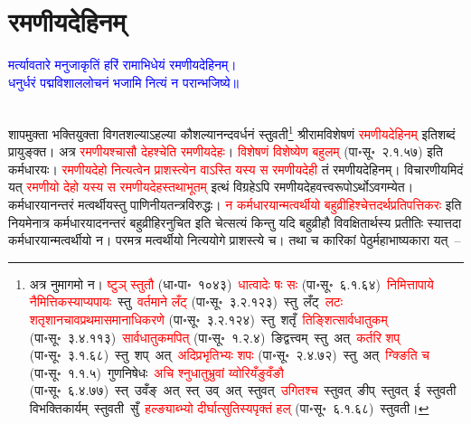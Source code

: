 \section[रमणीयदेहिनम्]{रमणीयदेहिनम्‌}
\centering\textcolor{blue}{मर्त्यावतारे मनुजाकृतिं हरिं रामाभिधेयं रमणीयदेहिनम्।\nopagebreak\\
धनुर्धरं पद्मविशाललोचनं भजामि नित्यं न परान्भजिष्ये॥}\nopagebreak\\
\\
\begin{sloppypar}\justifying\noindent\hspace{10mm} शाप\-मुक्ता भक्ति\-युक्ता विगत\-शल्याऽहल्या कौशल्यानन्द\-वर्धनं स्तुवती\footnote{अत्र नुमागमो न। \textcolor{red}{ष्टुञ् स्तुतौ} (धा॰पा॰~१०४३)~\arrow \textcolor{red}{धात्वादेः षः सः} (पा॰सू॰~६.१.६४)~\arrow \textcolor{red}{निमित्तापाये नैमित्तिकस्याप्यपायः}~\arrow स्तु~\arrow \textcolor{red}{वर्तमाने लँट्‌} (पा॰सू॰~३.२.१२३)~\arrow स्तु~लँट्~\arrow \textcolor{red}{लटः शतृ\-शानचावप्रथमा\-समानाधिकरणे} (पा॰सू॰~३.२.१२४)~\arrow स्तु~शतृँ~\arrow \textcolor{red}{तिङ्शित्सार्वधातुकम्‌} (पा॰सू॰~३.४.११३)~\arrow \textcolor{red}{सार्वधातुकमपित्‌} (पा॰सू॰~१.२.४)~\arrow ङिद्वत्त्वम्~\arrow स्तु~अत्~\arrow \textcolor{red}{कर्तरि शप्‌} (पा॰सू॰~३.१.६८)~\arrow स्तु~शप्~अत्~\arrow \textcolor{red}{अदिप्रभृतिभ्यः शपः} (पा॰सू॰~२.४.७२)~\arrow स्तु~अत्~\arrow \textcolor{red}{ग्क्ङिति च} (पा॰सू॰~१.१.५)~\arrow गुणनिषेधः~\arrow \textcolor{red}{अचि श्नुधातुभ्रुवां य्वोरियँङुवँङौ} (पा॰सू॰~६.४.७७)~\arrow स्त्~उवँङ्~अत्~\arrow स्त्~उव्~अत्~\arrow स्तुवत्~\arrow \textcolor{red}{उगितश्च}~\arrow स्तुवत्~ङीप्~\arrow स्तुवत्~ई~\arrow स्तुवती~\arrow विभक्तिकार्यम्~\arrow स्तुवती~सुँ~\arrow \textcolor{red}{हल्ङ्याब्भ्यो दीर्घात्सुतिस्यपृक्तं हल्‌} (पा॰सू॰~६.१.६८)~\arrow स्तुवती।} श्रीराम\-विशेषणं \textcolor{red}{रमणीय\-देहिनम्‌} इति\-शब्दं प्रायुङ्क्त। अत्र \textcolor{red}{रमणीयश्चासौ देहश्चेति रमणीय\-देहः}। \textcolor{red}{विशेषणं विशेष्येण बहुलम्‌} (पा॰सू॰~२.१.५७) इति कर्मधारयः। \textcolor{red}{रमणीय\-देहो नित्यत्वेन प्राशस्त्येन वाऽस्ति यस्य स रमणीय\-देही} तं रमणीय\-देहिनम्। विचारणीयमिदं यत् \textcolor{red}{रमणीयो देहो यस्य स रमणीयदेहस्तथाभूतम्‌} इत्थं विग्रहेऽपि रमणीय\-देहवत्त्व\-रूपोऽर्थोऽवगम्येत। कर्मधारयानन्तरं मत्वर्थीयस्तु पाणिनीय\-तन्त्र\-विरुद्धः। \textcolor{red}{न कर्मधारयान्मत्वर्थीयो बहुव्रीहिश्चेत्तदर्थ\-प्रतिपत्ति\-करः} इति नियमेनात्र कर्मधारयादनन्तरं बहुव्रीहिरनुचित इति चेत्सत्यं किन्तु यदि बहुव्रीहौ विवक्षितार्थस्य प्रतीतिः स्यात्तदा कर्मधारयान्मत्वर्थीयो न। परमत्र मत्वर्थीयो नित्ययोगे प्राशस्त्ये च। तथा च कारिकां पेठुर्महाभाष्य\-कारा यत्~–\end{sloppypar}
